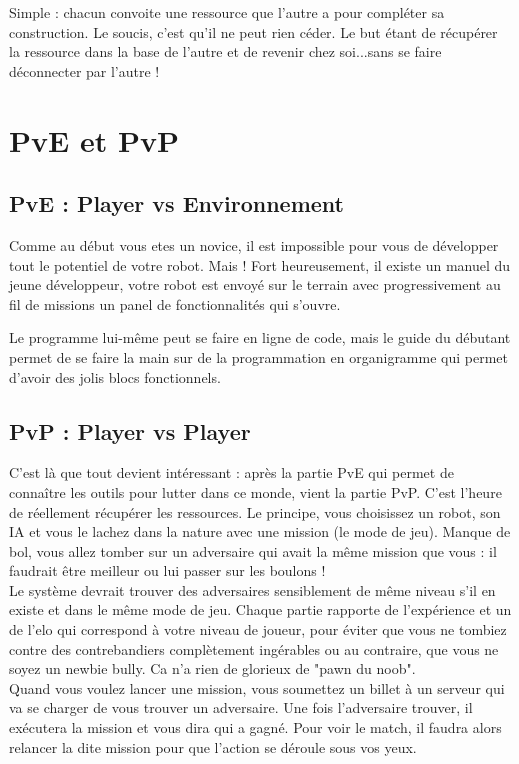 \documentclass[10pt]{article}
\begin{document}
Simple : chacun convoite une ressource que l'autre a pour compléter sa construction. Le soucis, c'est qu'il ne peut rien céder. Le but étant de récupérer la ressource dans la base de l'autre et de revenir chez soi...sans se faire déconnecter par l'autre !

\section{PvE et PvP}
\subsection{PvE : Player vs Environnement}

Comme au début vous etes un novice, il est impossible pour vous de développer tout le potentiel de votre robot. Mais ! Fort heureusement, il existe un manuel du jeune développeur, votre robot est envoyé sur le terrain avec progressivement au fil de missions un panel de fonctionnalités qui s'ouvre.
	
Le programme lui-même peut se faire en ligne de code, mais le guide du débutant permet de se faire la main sur de la programmation en organigramme qui permet d'avoir des jolis blocs fonctionnels.

\subsection{PvP : Player vs Player}

C'est là que tout devient intéressant :  après la partie PvE qui permet de connaître les outils pour lutter dans ce monde, vient la partie PvP. C'est l'heure de réellement récupérer les ressources. Le principe, vous choisissez un robot, son IA et vous le lachez dans la nature avec une mission (le mode de jeu). Manque de bol, vous allez tomber sur un adversaire qui avait la même mission que vous : il faudrait être meilleur ou lui passer sur les boulons ! \\
Le système devrait trouver des adversaires sensiblement de même niveau s'il en existe et dans le même mode de jeu. Chaque partie rapporte de l'expérience et un de l'elo qui correspond à votre niveau de joueur, pour éviter que vous ne tombiez contre des contrebandiers complètement ingérables ou au contraire, que vous ne soyez un newbie bully. Ca n'a rien de glorieux de "pawn du noob".\\
Quand vous voulez lancer une mission, vous soumettez un billet à un serveur qui va se charger de vous trouver un adversaire. Une fois l'adversaire trouver, il exécutera la mission et vous dira qui a gagné. Pour voir le match, il faudra alors relancer la dite mission pour que l'action se déroule sous vos yeux. 
 
\end{document}
